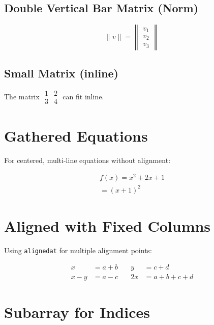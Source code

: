 \documentclass{article}
\begin{document}
\subsection{Double Vertical Bar Matrix (Norm)}

\begin{equation}
\|v\| = \begin{Vmatrix}
  v_1 \\
  v_2 \\
  v_3
\end{Vmatrix}
\end{equation}

\subsection{Small Matrix (inline)}

The matrix $\begin{smallmatrix} 1 & 2 \\ 3 & 4 \end{smallmatrix}$ can fit inline.

\section{Gathered Equations}

For centered, multi-line equations without alignment:

\begin{equation}
\begin{gathered}
f(x) = x^2 + 2x + 1 \\
= (x + 1)^2
\end{gathered}
\end{equation}

\section{Aligned with Fixed Columns}

Using \texttt{alignedat} for multiple alignment points:

\begin{equation}
\begin{alignedat}{2}
x &= a + b \quad & y &= c + d \\
x - y &= a - c \quad & 2x &= a + b + c + d
\end{alignedat}
\end{equation}

\section{Subarray for Indices}
\end{document}
